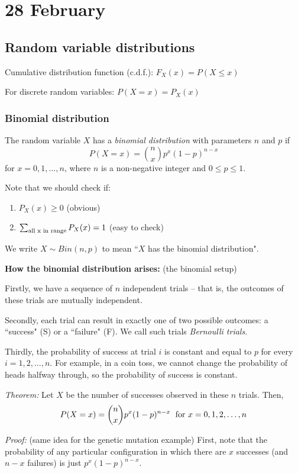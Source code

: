 \documentclass[12pt]{article}
\begin{document}
\section{28 February}
\subsection{Random variable distributions}
Cumulative distribution function (c.d.f.): $F_X (x) = P(X \leq x)$

For discrete random variables: $P(X = x) = P_X (x)$

\subsubsection{Binomial distribution}

The random variable $X$ has a \emph{binomial distribution} with parameters $n$ and $p$ if
\[
    P(X = x) = {n \choose x} p^x (1-p)^{n-x}
\]
for $x = 0, 1, \ldots, n$, where $n$ is a non-negative integer and $0 \leq p \leq 1$.

Note that we should check if:
\begin{enumerate}
    \item $P_X (x) \geq 0$ (obvious)
    \item $\sum_{\textnormal{all x in range}} P_X (x) = 1$ (easy to check)
\end{enumerate}

We write $X \sim Bin (n, p)$ to mean ``$X$ has the binomial distribution".

\textbf{How the binomial distribution arises:} (the binomial setup)

Firstly, we have a sequence of $n$ independent trials -- that is, the outcomes of these trials are mutually independent.

Secondly, each trial can result in exactly one of two possible outcomes: a ``success" (S) or a ``failure" (F). We call such trials \emph{Bernoulli trials}.

Thirdly, the probability of success at trial $i$ is constant and equal to $p$ for every $i = 1, 2, \dots, n$. For example, in a coin toss, we cannot change the probability of heads halfway through, so the probability of success is constant.

\emph{Theorem:} Let $X$ be the number of successes observed in these $n$ trials. Then,
\[
    P(X = x) = {n \choose x} p^x (1-p)^{n - x} \; \textnormal{ for } x = 0,1,2,\ldots, n
\]

\emph{Proof:} (same idea for the genetic mutation example) First, note that the probability of any particular configuration in which there are $x$ successes (and $n-x$ failures) is just $p^x (1-p)^{n-x}$.
\end{document}
